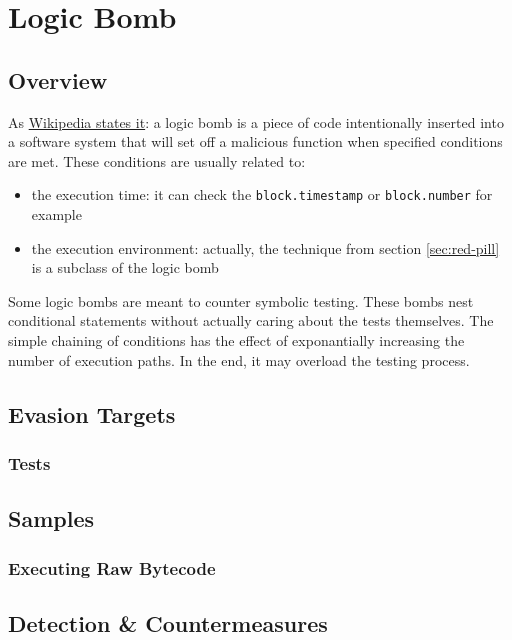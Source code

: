 \section{Logic Bomb} \label{sec:time-bomb}

\subsection{Overview}

As \href{\urlarticlelogicbomb}{Wikipedia states it}: a logic bomb is a piece of code intentionally inserted into a software system that will set off a malicious function when specified conditions are met.
These conditions are usually related to:

\begin{itemize}
\item{the execution time: it can check the \lstinline[language=Solidity]{block.timestamp} or \lstinline[language=Solidity]{block.number} for example}
\item{the execution environment: actually, the technique from section \ref{sec:red-pill} is a subclass of the logic bomb}
\end{itemize}

Some logic bombs are meant to counter symbolic testing.
These bombs nest conditional statements without actually caring about the tests themselves.
The simple chaining of conditions has the effect of exponantially increasing the number of execution paths.
In the end, it may overload the testing process.

\subsection{Evasion Targets}

\subsubsection{Tests}

\subsection{Samples}

\subsubsection{Executing Raw Bytecode}

\subsection{Detection \& Countermeasures}
